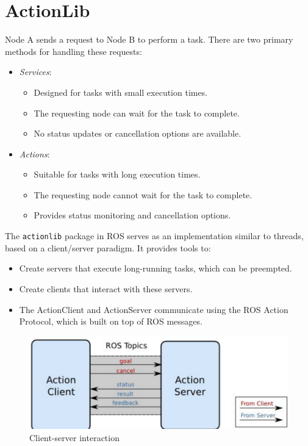 \section{ActionLib}

Node A sends a request to Node B to perform a task. 
There are two primary methods for handling these requests: 
\begin{itemize}
    \item \textit{Services}: 
        \begin{itemize}
            \item Designed for tasks with small execution times.
            \item The requesting node can wait for the task to complete.
            \item  No status updates or cancellation options are available.
        \end{itemize}
    \item \textit{Actions}:
        \begin{itemize}
            \item Suitable for tasks with long execution times.
            \item The requesting node cannot wait for the task to complete.
            \item Provides status monitoring and cancellation options.
        \end{itemize}
\end{itemize}
The \texttt{actionlib} package in ROS serves as an implementation similar to threads, based on a client/server paradigm. 
It provides tools to:
\begin{itemize}
    \item Create servers that execute long-running tasks, which can be preempted.
    \item Create clients that interact with these servers.
    \item The ActionClient and ActionServer communicate using the ROS Action Protocol, which is built on top of ROS messages.
\end{itemize}
\begin{figure}[H]
\centering
\includegraphics[width=0.75\linewidth]{images/cs.png}
\caption{Client-server interaction}
\end{figure}
